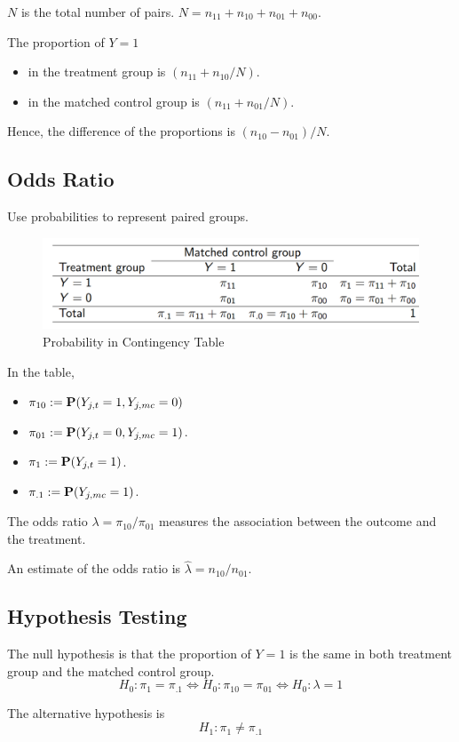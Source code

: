 $N$ is the total number of pairs. $N = n_{11} + n_{10} + n_{01} + n_{00}$.

The proportion of $Y = 1$ 
\begin{itemize}
	\item in the treatment group is $(n_{11} + n_{10} / N)$.
	\item in the matched control group is $(n_{11} + n_{01} / N)$.
\end{itemize}

Hence, the difference of the proportions is $(n_{10} - n_{01}) / N$.

\subsection{Odds Ratio}
Use probabilities to represent paired groups.
\begin{figure}[H]
	\centering
	\includegraphics[width=0.7\linewidth]{fig/screenshot008}
	\caption{Probability in Contingency Table}
	\label{fig:screenshot008}
\end{figure}
In the table,
\begin{itemize}
	\item $\pi_{10} := \P(Y_{j,t} = 1, Y_{j, mc} = 0)$
	\item $\pi_{01} := \P(Y_{j,t} = 0, Y_{j, mc} = 1)$.
	\item $\pi_{1} := \P(Y_{j,t} = 1)$.
	\item $\pi_{.1} := \P(Y_{j, mc} = 1)$.
\end{itemize}

The odds ratio $\lambda = \pi_{10}/\pi_{01}$ measures the association between the outcome and the treatment.

An estimate of the odds ratio is $\hat{\lambda} = n_{10} / n_{01}$.

\subsection{Hypothesis Testing}
The null hypothesis is that the proportion of $Y = 1$ is the same in both treatment group and the matched control group.
\[H_0: \pi_{1} = \pi_{.1} \iff H_0: \pi_{10} = \pi_{01} \iff H_0: \lambda = 1\]

The alternative hypothesis is
\[H_1: \pi_1 \neq \pi_{.1}\]

